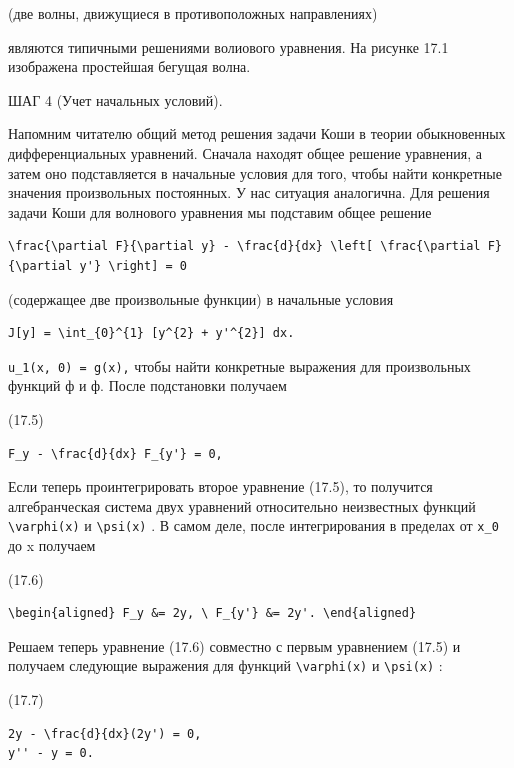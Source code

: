 \documentclass[
  ukrainian,
]{article}
\begin{document}
(две волны, движущиеся в противоположных направлениях)

являются типичными решениями волиового уравнения. На рисунке 17.1
изображена простейшая бегущая волна.

ШАГ 4 (Учет начальных условий).

Напомним читателю общий метод решения задачи Коши в теории обыкновенных
дифференциальных уравнений. Сначала находят общее решение уравнения, а
затем оно подставляется в начальные условия для того, чтобы найти
конкретные значения произвольных постоянных. У нас ситуация аналогична.
Для решения задачи Коши для волнового уравнения мы подставим общее
решение

\begin{verbatim}
\frac{\partial F}{\partial y} - \frac{d}{dx} \left[ \frac{\partial F}{\partial y'} \right] = 0
\end{verbatim}

(содержащее две произвольные функции) в начальные условия

\begin{verbatim}
J[y] = \int_{0}^{1} [y^{2} + y'^{2}] dx.
\end{verbatim}

\texttt{u\_1(x,\ 0)\ =\ g(x),} чтобы найти конкретные выражения для
произвольных функций ф и ф. После подстановки получаем

(17.5)

\begin{verbatim}
F_y - \frac{d}{dx} F_{y'} = 0,
\end{verbatim}

Если теперь проинтегрировать второе уравнение (17.5), то получится
алгебранческая система двух уравнений относительно неизвестных функций
\texttt{\textbackslash{}varphi(x)} и \texttt{\textbackslash{}psi(x)} . В
самом деле, после интегрирования в пределах от \texttt{x\_0} до x
получаем

(17.6)

\begin{verbatim}
\begin{aligned} F_y &= 2y, \ F_{y'} &= 2y'. \end{aligned}
\end{verbatim}

Решаем теперь уравнение (17.6) совместно с первым уравнением (17.5) и
получаем следующие выражения для функций
\texttt{\textbackslash{}varphi(x)} и \texttt{\textbackslash{}psi(x)} :

(17.7)

\begin{verbatim}
2y - \frac{d}{dx}(2y') = 0,
y'' - y = 0.
\end{verbatim}
\end{document}

